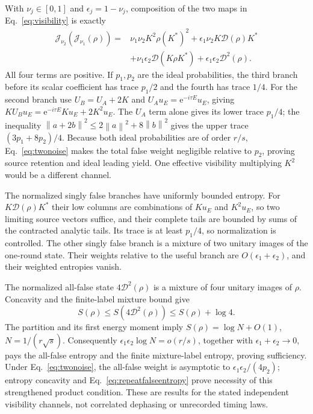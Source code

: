 \documentclass[aps,pra,reprint,superscriptaddress,longbibliography]{revtex4-2}
\newcommand{\ee}{\mathrm e}
\newcommand{\norm}[1]{\left\lVert#1\right\rVert}
\begin{document}
With $\nu_j\in[0,1]$ and $\epsilon_j=1-\nu_j$, composition of the two maps in
Eq.~\eqref{eq:visibility} is exactly
\begin{align}
 \mathcal J_{\nu_2}(\mathcal J_{\nu_1}(\rho))
 ={}&\nu_1\nu_2K^2\rho(K^*)^2
 +\epsilon_1\nu_2K\mathcal D(\rho)K^*\nonumber\\
 &+\nu_1\epsilon_2\mathcal D(K\rho K^*)
 +\epsilon_1\epsilon_2\mathcal D^2(\rho).               \label{eq:repeatnoisemap}
\end{align}
All four terms are positive. If $p_1,p_2$ are the ideal probabilities,
the third branch before its scalar coefficient has trace $p_1/2$
and the fourth has trace $1/4$. For the second branch use
$U_B=U_A+2K$ and $U_Au_E=\ee^{-i\tau E}u_E$, giving
$KU_Bu_E=\ee^{-i\tau E}Ku_E+2K^2u_E$.
The $U_A$ term alone gives its lower trace $p_1/4$; the inequality
$\norm{a+2b}^2\le2\norm a^2+8\norm b^2$ gives the upper trace
$(3p_1+8p_2)/4$. Because both ideal probabilities are of order
$r/s$, Eq.~\eqref{eq:twonoise} makes the total false weight
negligible relative to $p_2$, proving source retention and ideal
leading yield. One effective visibility multiplying $K^2$ would
be a different channel.

The normalized singly false branches have uniformly bounded
entropy. For $K\mathcal D(\rho)K^*$ their low columns are
combinations of $Ku_E$ and $K^2u_E$, so two limiting source
vectors suffice, and their complete tails are bounded by sums
of the contracted analytic tails. Its trace is at least $p_1/4$,
so normalization is controlled. The other singly false branch
is a mixture of two unitary images of the one-round state.
Their weights relative to the useful branch are
$O(\epsilon_1+\epsilon_2)$, and their weighted entropies vanish.

The normalized all-false state $4\mathcal D^2(\rho)$ is a
mixture of four unitary images of $\rho$. Concavity and the
finite-label mixture bound give
\begin{equation}
 S(\rho)\le S(4\mathcal D^2(\rho))\le S(\rho)+\log4.
                                                        \label{eq:repeatfalseentropy}
\end{equation}
The partition and its first energy moment imply
$S(\rho)=\log N+O(1)$, $N=1/(r\sqrt s)$.
Consequently $\epsilon_1\epsilon_2\log N=o(r/s)$,
together with $\epsilon_1+\epsilon_2\to0$, pays the all-false
entropy and the finite mixture-label entropy, proving sufficiency.
Under Eq.~\eqref{eq:twonoise}, the all-false weight is
asymptotic to $\epsilon_1\epsilon_2/(4p_2)$; entropy concavity
and Eq.~\eqref{eq:repeatfalseentropy} prove necessity of this
strengthened product condition. These are results for the stated
independent visibility channels, not correlated dephasing or
unrecorded timing laws.
\end{document}
